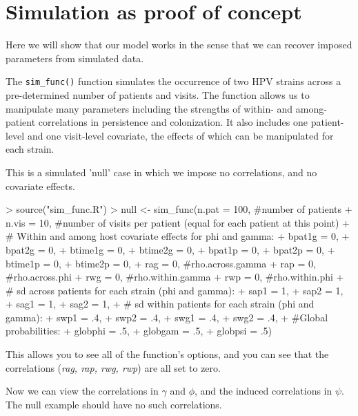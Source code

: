 \documentclass{article}
\begin{document}
\section*{Simulation as proof of concept}

Here we will show that our model works in the sense that we can recover imposed parameters from simulated data. 

The \texttt{sim\_func()} function simulates the occurrence of two HPV strains across a pre-determined number of patients and visits. The function allows us to manipulate many parameters including the strengths of within- and among-patient correlations in persistence and colonization. It also includes one patient-level and one visit-level covariate, the effects of which can be manipulated for each strain.

This is a simulated 'null' case in which we impose no correlations, and no covariate effects. 
\begin{Schunk}
\begin{Sinput}
> source("sim_func.R")
> null <- sim_func(n.pat = 100, #number of patients
+                  n.vis = 10,  #number of visits per patient (equal for each patient at this point)
+                  # Within and among host covariate effects for phi and gamma:
+                  bpat1g = 0, 
+                  bpat2g = 0,
+                  btime1g = 0,
+                  btime2g = 0,
+                  bpat1p = 0,
+                  bpat2p = 0,
+                  btime1p = 0,
+                  btime2p = 0,
+                  rag = 0, #rho.across.gamma
+                  rap = 0, #rho.across.phi
+                  rwg = 0, #rho.within.gamma
+                  rwp = 0, #rho.within.phi
+                  # sd across patients for each strain (phi and gamma):
+                  sap1 = 1, 
+                  sap2 = 1,
+                  sag1 = 1,
+                  sag2 = 1,
+                  # sd within patients for each strain (phi and gamma):
+                  swp1 = .4, 
+                  swp2 = .4,
+                  swg1 = .4,
+                  swg2 = .4,
+                  #Global probabilities:
+                  globphi = .5, 
+                  globgam = .5, 
+                  globpsi = .5)
\end{Sinput}
\end{Schunk}
This allows you to see all of the function's options, and you can see that the correlations (\emph{rag, rap, rwg, rwp}) are all set to zero.

Now we can view the correlations in $\gamma$ and $\phi$, and the induced correlations in $\psi$. The null example should have no such correlations.
\end{document}
